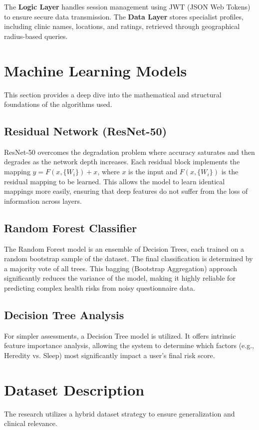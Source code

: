 \documentclass[conference]{IEEEtran}
\begin{document}
The \textbf{Logic Layer} handles session management using JWT (JSON Web Tokens) to ensure secure data transmission. The \textbf{Data Layer} stores specialist profiles, including clinic names, locations, and ratings, retrieved through geographical radius-based queries.

\section{Machine Learning Models}
This section provides a deep dive into the mathematical and structural foundations of the algorithms used.

\subsection{Residual Network (ResNet-50)}
ResNet-50 overcomes the degradation problem where accuracy saturates and then degrades as the network depth increases. Each residual block implements the mapping $y = F(x, \{W_i\}) + x$, where $x$ is the input and $F(x, \{W_i\})$ is the residual mapping to be learned. This allows the model to learn identical mappings more easily, ensuring that deep features do not suffer from the loss of information across layers.

\subsection{Random Forest Classifier}
The Random Forest model is an ensemble of Decision Trees, each trained on a random bootstrap sample of the dataset. The final classification is determined by a majority vote of all trees. This bagging (Bootstrap Aggregation) approach significantly reduces the variance of the model, making it highly reliable for predicting complex health risks from noisy questionnaire data.

\subsection{Decision Tree Analysis}
For simpler assessments, a Decision Tree model is utilized. It offers intrinsic feature importance analysis, allowing the system to determine which factors (e.g., Heredity vs. Sleep) most significantly impact a user's final risk score.

\section{Dataset Description}
The research utilizes a hybrid dataset strategy to ensure generalization and clinical relevance.
\end{document}
